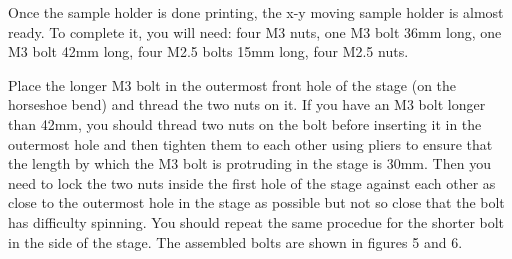 \documentclass[runningheads]{llncs}
\begin{document}
Once the sample holder is done printing, the x-y moving sample holder is almost ready. To complete it, you will need: four M3 nuts, one M3 bolt 36mm long, one M3 bolt 42mm long, four M2.5 bolts 15mm long, four M2.5 nuts.

Place the longer M3 bolt in the outermost front hole of the stage (on the horseshoe bend) and thread the two nuts on it. If you have an M3 bolt longer than 42mm, you should thread two nuts on the bolt before inserting it in the outermost hole and then tighten them to each other using pliers to ensure that the length by which the M3 bolt is protruding in the stage is 30mm. Then you need to lock the two nuts inside the first hole of the stage against each other as close to the outermost hole in the stage as possible but not so close that the bolt has difficulty spinning. You should repeat the same procedue for the shorter bolt in the side of the stage. The assembled bolts are shown in figures 5 and 6.
\end{document}
